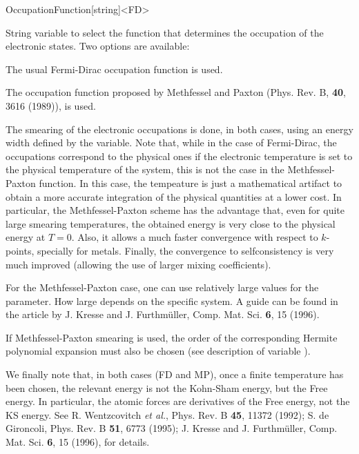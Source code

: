 \begin{fdfentry}{OccupationFunction}[string]<FD>
  
  String variable to select the function that determines the
  occupation of the electronic states. Two options are available:
  \begin{fdfoptions}
    \option[FD]%
    The usual Fermi-Dirac occupation function is used.

    \option[MP]%
    The occupation function proposed by Methfessel and
    Paxton (Phys. Rev. B, \textbf{40}, 3616 (1989)), is used.

  \end{fdfoptions}
  The smearing of the electronic occupations is done, in both cases,
  using an energy width defined by the 
  variable. Note that, while in the case of Fermi-Dirac, the
  occupations correspond to the physical ones if the electronic
  temperature is set to the physical temperature of the system, this
  is not the case in the Methfessel-Paxton function. In this case, the
  tempeature is just a mathematical artifact to obtain a more accurate
  integration of the physical quantities at a lower cost. In
  particular, the Methfessel-Paxton scheme has the advantage that,
  even for quite large smearing temperatures, the obtained energy is
  very close to the physical energy at $T=0$.  Also, it allows a much
  faster convergence with respect to $k$-points, specially for
  metals. Finally, the convergence to selfconsistency is very much
  improved (allowing the use of larger mixing coefficients).

  For the Methfessel-Paxton case, one can use relatively large values
  for the  parameter. How large depends
  on the specific system. A guide can be found in the article by
  J. Kresse and J. Furthm\"uller, Comp. Mat. Sci.  \textbf{6}, 15
  (1996).

  If Methfessel-Paxton smearing is used, the order of the
  corresponding Hermite polynomial expansion must also be chosen (see
  description of variable ).

  We finally note that, in both cases (FD and MP), once a finite
  temperature has been chosen, the relevant energy is not the
  Kohn-Sham energy, but the Free energy. In particular, the atomic
  forces are derivatives of the Free energy, not the KS energy. See
  R. Wentzcovitch \textit{et al.}, Phys. Rev. B \textbf{45}, 11372
  (1992); S. de Gironcoli, Phys. Rev. B \textbf{51}, 6773 (1995);
  J. Kresse and J. Furthm\"uller, Comp. Mat. Sci.  \textbf{6}, 15
  (1996), for details.

\end{fdfentry}

